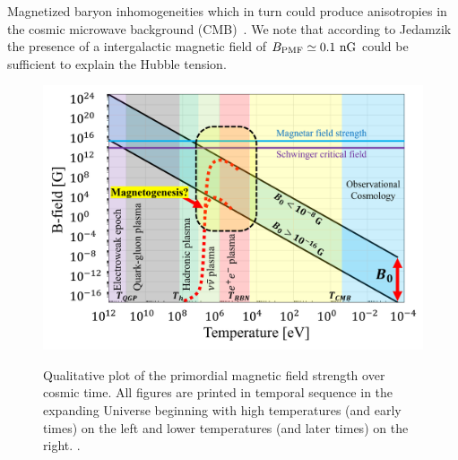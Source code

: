 Magnetized baryon inhomogeneities which in turn could produce anisotropies in the cosmic microwave background (CMB)~\cite{Jedamzik:2013gua,Abdalla:2022yfr}. We note that according to Jedamzik~\cite{Jedamzik:2020krr} the presence of a intergalactic magnetic field of $B_\mathrm{PMF}\simeq0.1{\rm\ nG}$ could be sufficient to explain the Hubble tension.

\begin{figure}
 \centering
 \includegraphics[width=0.90\linewidth]{plots/pmf.png}
 \caption{Qualitative plot of the primordial magnetic field strength over cosmic time. All figures are printed in temporal sequence in the expanding Universe beginning with high temperatures (and early times) on the left and lower temperatures (and later times) on the right. . }
 \label{fig:pmf}
\end{figure}

